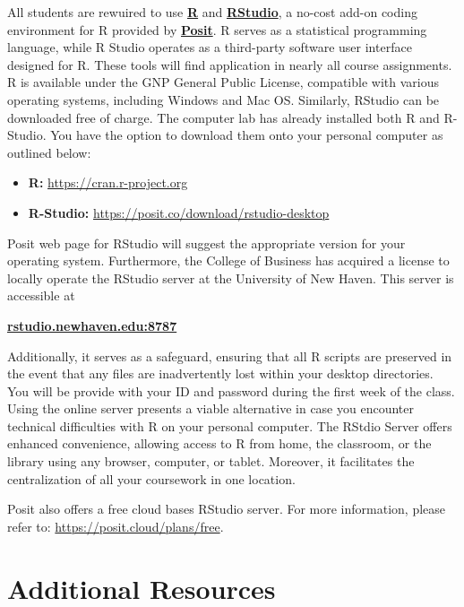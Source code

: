 \documentclass[11pt,]{article}
\begin{document}
All students are rewuired to use
\href{https://www.r-project.org}{\textbf{R}} and
\href{https://posit.co/products/open-source/rstudio/}{\textbf{RStudio}},
a no-cost add-on coding environment for R provided by
\href{https://posit.co}{\textbf{Posit}}. R serves as a statistical
programming language, while R Studio operates as a third-party software
user interface designed for R. These tools will find application in
nearly all course assignments. R is available under the GNP General
Public License, compatible with various operating systems, including
Windows and Mac OS. Similarly, RStudio can be downloaded free of charge.
The computer lab has already installed both R and R-Studio. You have the
option to download them onto your personal computer as outlined below:

\begin{itemize}
\item[] \textbf{R:} \href{https://cran.r-project.org}{https://cran.r-project.org}
\item[] \textbf{R-Studio:} \href{https://posit.co/download/rstudio-desktop/}{https://posit.co/download/rstudio-desktop}
\end{itemize}

Posit web page for RStudio will suggest the appropriate version for your
operating system. Furthermore, the College of Business has acquired a
license to locally operate the RStudio server at the University of New
Haven. This server is accessible at

\begin{center}
{\bfseries \href{rstudio.newhaven.edu:8787}{rstudio.newhaven.edu:8787} }
\end{center}

Additionally, it serves as a safeguard, ensuring that all R scripts are
preserved in the event that any files are inadvertently lost within your
desktop directories. You will be provide with your ID and password
during the first week of the class. Using the online server presents a
viable alternative in case you encounter technical difficulties with R
on your personal computer. The RStdio Server offers enhanced
convenience, allowing access to R from home, the classroom, or the
library using any browser, computer, or tablet. Moreover, it facilitates
the centralization of all your coursework in one location.

Posit also offers a free cloud bases RStudio server. For more
information, please refer to: \url{https://posit.cloud/plans/free}.

\hypertarget{additional-resources}{%
\section{Additional Resources}\label{additional-resources}}
\end{document}
